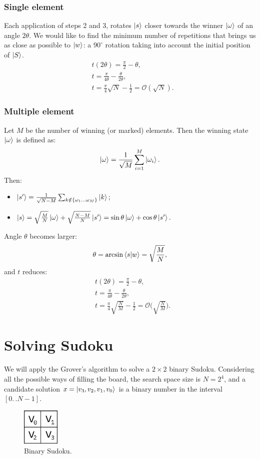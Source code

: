 \documentclass{article}
\newcommand*{\twodots}{\mathrel{. \, .}}
\begin{document}
\subsubsection{Single element}
Each application of steps 2 and 3, rotates $\ket{s}$
closer towards the winner $\ket{\omega}$ of an angle $2 \theta$.
We would like to find the minimum number of repetitions that brings us as close
as possible to $\ket{w}$: a $90^\circ$ rotation taking into account the initial
position of $\ket{S}$.
\begin{align*}
  & t(2 \theta) = \frac{\pi}{2} - \theta, \\
  & t = \frac{\pi}{4 \theta} - \frac{\theta}{2\theta}, \\
  & t = \frac{\pi}{4} \sqrt{N}- \frac{1}{2} = \mathcal O(\sqrt{N}).
\end{align*}

\subsubsection{Multiple element}
Let $M$ be the number of winning (or marked) elements.
Then the winning state $\ket{\omega}$ is defined as:
\[
  \ket{\omega} = \frac{1}{\sqrt{M}} \sum_{i = 1}^{M} \ket{\omega_i}.
\]
Then:
\begin{itemize}
  \item
  $
    \ket{s'} =
    \frac{1}{\sqrt{N-M}} \sum_{k \notin \{ \omega_1 \ldots \omega_M \}} \ket{k};
  $
  \item
  $
    \ket{s} =
    \sqrt{\frac{M}{N}} \ket{\omega} + \sqrt{\frac{N-M}{N}} \ket{s'}
    = \sin\theta \ket{\omega} + \cos{\theta} \ket{s'}.
  $
\end{itemize}
Angle $\theta$ becomes larger:
\[
  \theta = \arcsin \braket{s|w} = \sqrt{\frac{M}{N}},
\]
and $t$ reduces:
\begin{align*}
  & t(2 \theta) = \frac{\pi}{2} - \theta, \\
  & t = \frac{\pi}{4 \theta} - \frac{\theta}{2\theta}, \\
  & t = \frac{\pi}{4} \sqrt{\frac{N}{M}}- \frac{1}{2}
    = \mathcal O\biggl(\sqrt{\frac{N}{M}}\biggr).
\end{align*}
\section{Solving Sudoku}
We will apply the Grover's algorithm to solve a $2 \times 2$ binary Sudoku.
Considering all the possible ways of filling the board, the search space size
is $N = 2^{4}$, and a candidate solution $x = \ket{v_3, v_2,
  v_1, v_0}$ is a binary number in the interval $[0 \twodots N-1]$.
\begin{figure}[H]
  \centering
  \includegraphics[width=50pt]{Img/binary-sudoku.png}
  \caption{Binary Sudoku.}
\end{figure}
\end{document}
